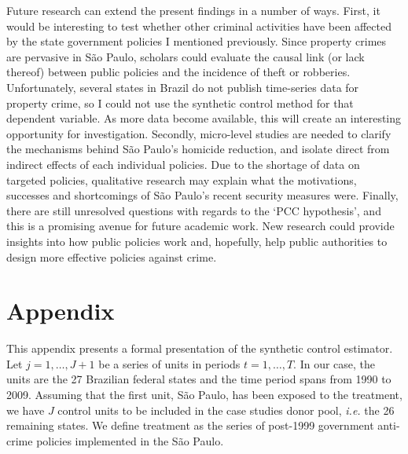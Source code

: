 Future research can extend the present findings in a number of ways. First, it would be interesting to test whether other criminal activities have been affected by the state government policies I mentioned previously. Since property crimes are pervasive in São Paulo, scholars could evaluate the causal link (or lack thereof) between public policies and the incidence of theft or robberies. Unfortunately, several states in Brazil do not publish time-series data for property crime, so I could not use the synthetic control method for that dependent variable. As more data become available, this will create an interesting opportunity for investigation. Secondly, micro-level studies are needed to clarify the mechanisms behind São Paulo's homicide reduction, and isolate direct from indirect effects of each individual policies. Due to the shortage of data on targeted policies, qualitative research may explain what the motivations, successes and shortcomings of São Paulo's recent security measures were. Finally, there are still unresolved questions with regards to the `PCC hypothesis', and this is a promising avenue for future academic work. New research could provide insights into how public policies work and, hopefully, help public authorities to design more effective policies against crime.

\newpage

\section{Appendix} 
\label{sec:appendix_a}

This appendix presents a formal presentation of the synthetic control estimator. Let $j = 1, \dots, J + 1$ be a series of units in periods $t = 1, \dots, T$. In our case, the units are the 27 Brazilian federal states and the time period spans from 1990 to 2009. Assuming that the first unit, São Paulo, has been exposed to the treatment, we have $J$ control units to be included in the case studies donor pool, \emph{i.e.} the 26 remaining states. We define treatment as the series of post-1999 government anti-crime policies implemented in the São Paulo.

